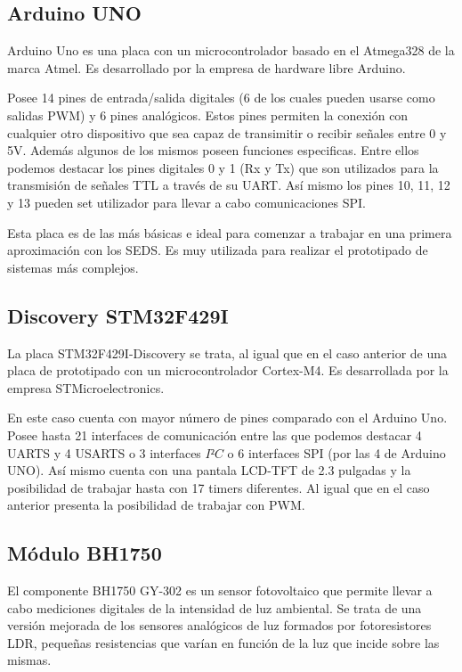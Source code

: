 \subsection{Arduino UNO}\label{subsec:arduino}
Arduino Uno es una placa con un microcontrolador basado en el
Atmega328 de la marca Atmel. Es desarrollado por la empresa de
hardware libre Arduino.

 Posee 14 pines de entrada/salida digitales (6 de los cuales
pueden usarse como salidas PWM) y 6 pines anal\'ogicos. Estos pines
permiten la conexi\'on con cualquier otro dispositivo que sea capaz de
transimitir o recibir se\~nales entre 0 y 5V. Adem\'as algunos de los
mismos poseen funciones especificas. Entre ellos podemos destacar 
los pines digitales 0 y 1 (Rx y Tx) que son utilizados para la transmisi\'on de
se\~nales TTL a trav\'es de su UART. As\'i mismo los pines 10, 11, 12 y
13 pueden set utilizador para llevar a cabo comunicaciones SPI.

Esta placa es de las m\'as b\'asicas e ideal para comenzar a trabajar
en una primera aproximaci\'on con los SEDS. Es muy utilizada para
realizar el prototipado de sistemas m\'as complejos.

\subsection{Discovery STM32F429I}\label{subsec:discovery}

La placa STM32F429I-Discovery se trata, al igual que en el caso
anterior de una placa de prototipado con un microcontrolador
Cortex-M4. Es desarrollada por la empresa STMicroelectronics. 

En este
caso cuenta con mayor n\'umero de pines comparado con el Arduino
Uno. Posee hasta 21 interfaces de comunicaci\'on entre las que podemos
destacar 4 UARTS y 4 USARTS o 3 interfaces $I²C$ o 6 interfaces SPI
(por las 4 de Arduino UNO). As\'i mismo cuenta
con una pantala LCD-TFT de 2.3 pulgadas y la posibilidad de trabajar
hasta con 17 timers diferentes. Al igual que en el caso anterior
presenta la posibilidad de trabajar con PWM.

\subsection{M\'odulo BH1750}\label{subsec:bh1750}
El componente BH1750 GY-302 es un sensor fotovoltaico que permite
llevar a cabo mediciones digitales de la intensidad de luz
ambiental. Se trata de una versi\'on mejorada de los sensores
anal\'ogicos de luz formados por fotoresistores LDR, peque\~nas resistencias que
var\'ian en funci\'on de la luz que incide sobre las mismas.

